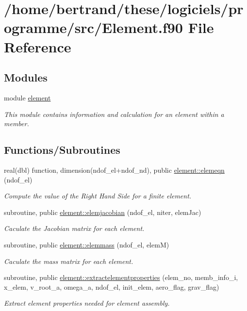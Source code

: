 \hypertarget{_element_8f90}{}\section{/home/bertrand/these/logiciels/programme/src/\+Element.f90 File Reference}
\label{_element_8f90}
\subsection*{Modules}
\begin{DoxyCompactItemize}
\item 
module \hyperlink{namespaceelement}{element}
\begin{DoxyCompactList}\small\item\em This module contains information and calculation for an element within a member. \end{DoxyCompactList}\end{DoxyCompactItemize}
\subsection*{Functions/\+Subroutines}
\begin{DoxyCompactItemize}
\item 
real(dbl) function, dimension(ndof\+\_\+el+ndof\+\_\+nd), public \hyperlink{namespaceelement_a267c29ec99208b5121ba2c6af7180016}{element\+::elemeqn} (ndof\+\_\+el)
\begin{DoxyCompactList}\small\item\em Compute the value of the Right Hand Side for a finite element. \end{DoxyCompactList}\item 
subroutine, public \hyperlink{namespaceelement_a172c175acb51f133e8b15a64c6e7f238}{element\+::elemjacobian} (ndof\+\_\+el, niter, elem\+Jac)
\begin{DoxyCompactList}\small\item\em Caculate the Jacobian matrix for each element. \end{DoxyCompactList}\item 
subroutine, public \hyperlink{namespaceelement_aeac4f943f8f4e225381fac5a1278d4eb}{element\+::elemmass} (ndof\+\_\+el, elemM)
\begin{DoxyCompactList}\small\item\em Caculate the mass matrix for each element. \end{DoxyCompactList}\item 
subroutine, public \hyperlink{namespaceelement_aa0f853882f2705c359567e433bb31fe9}{element\+::extractelementproperties} (elem\+\_\+no, memb\+\_\+info\+\_\+i, x\+\_\+elem, v\+\_\+root\+\_\+a, omega\+\_\+a, ndof\+\_\+el, init\+\_\+elem, aero\+\_\+flag, grav\+\_\+flag)
\begin{DoxyCompactList}\small\item\em Extract element properties needed for element assembly. \end{DoxyCompactList}\end{DoxyCompactItemize}

